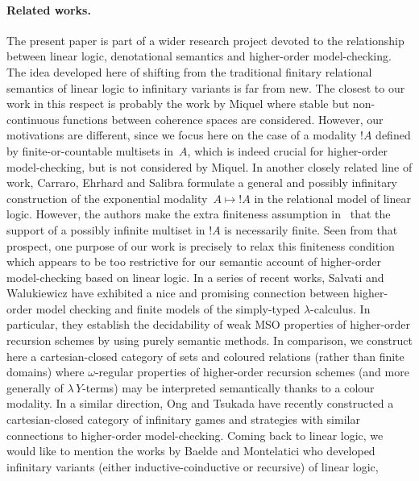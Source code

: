 \documentclass[runningheads,a4paper]{llncs}
\begin{document}
\paragraph*{Related works.}
The present paper is part of a wider research project devoted to the relationship 
between linear logic, denotational semantics and higher-order model-checking.
The idea developed here of shifting from the traditional finitary relational semantics
of linear logic to infinitary variants is far from new.
The closest to our work in this respect is probably the work by Miquel \cite{these-miquel}
where stable but non-continuous functions between coherence spaces are considered.
However, our motivations are different, since we focus here on the case 
of a modality $!A$ defined by finite-or-countable multisets in~$A$, 
which is indeed crucial for higher-order model-checking, but is not considered by Miquel.
In another closely related line of work, Carraro, Ehrhard and Salibra \cite{carraro-ehrhard-salibra}
formulate a general and possibly infinitary construction of the exponential modality~$A\mapsto {!A}$
in the relational model of linear logic.
However, the authors make the extra finiteness assumption in~\cite{carraro-ehrhard-salibra}
that the support of a possibly infinite multiset in $!A$ is necessarily finite.
Seen from that prospect, one purpose of our work is precisely to relax this finiteness condition which
appears to be too restrictive for our semantic account of higher-order model-checking
based on linear logic.
In a series of recent works,
Salvati and Walukiewicz \cite{salvati-walukiewicz2} \cite{salvati-walukiewicz3} have exhibited
a nice and promising connection between  higher-order model checking
and finite models of the simply-typed $\lambda$-calculus.
In particular, they establish the decidability of weak MSO properties of higher-order recursion schemes
by using purely semantic methods.
In comparison, we construct here a cartesian-closed category of sets and coloured relations
(rather than finite domains) where $\omega$-regular properties of higher-order recursion schemes
(and more generally of $\lambda\,Y$-terms) may be interpreted semantically thanks to a colour modality.
In a similar direction, Ong and Tsukada \cite{ong-tsukada} have recently constructed
a cartesian-closed category of infinitary games and strategies with similar connections
to higher-order model-checking.
Coming back to linear logic,
we would like to mention the works by Baelde \cite{baelde} and Montelatici \cite{montelatici}
who developed infinitary variants (either inductive-coinductive or recursive) of linear logic,
\end{document}
